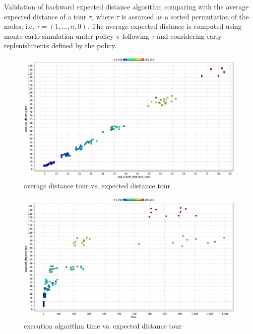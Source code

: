 Validation of backward expected distance algorithm comparing with the average expected distance of a tour $\tau$, where $\tau$ is assumed as a sorted permutation of the nodes, i.e. $\tau = (1,\ldots,n,0)$. The average expected distance is computed using monte carlo simulation under policy $\pi$ following $\tau$ and considering early replenishments defined by the policy.

\begin{figure}[!htbp]
  \begin{center}
   \includegraphics[width=1\textwidth]{Images/Chapter5/avg_vs_expected_distance_tour.eps}
  \end{center}
    \caption{average distance tour vs. expected distance tour}\label{fig:avg_distance_vs_expected_distance_tour}
\end{figure}

\begin{figure}[!htbp]
  \begin{center}
   \includegraphics[width=1\textwidth]{Images/Chapter5/time_vs_expected_distance_tour.eps}
  \end{center}
    \caption{execution algorithm time vs. expected distance tour}\label{fig:time_distance_vs_expected_distance_tour}
\end{figure}